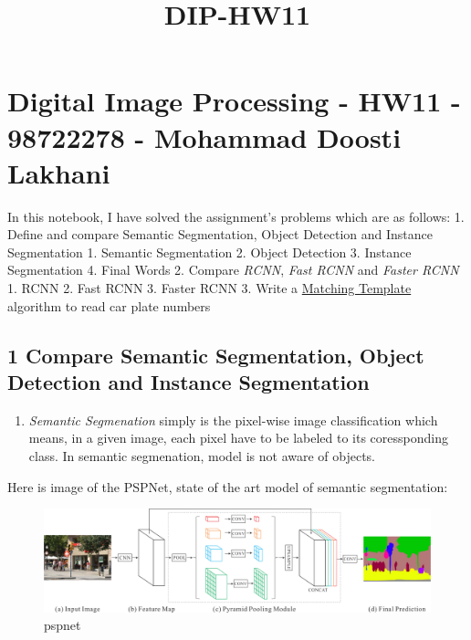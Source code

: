 \documentclass[11pt]{article}
\title{DIP-HW11}
\makeatletter
\def\maxwidth{\ifdim\Gin@nat@width>\linewidth\linewidth
    \else\Gin@nat@width\fi}
\let\Oldincludegraphics\includegraphics
\renewcommand{\includegraphics}[1]{\Oldincludegraphics[width=.8\maxwidth]{#1}}
\providecommand{\tightlist}{%
      \setlength{\itemsep}{0pt}\setlength{\parskip}{0pt}}
\makeatother
\begin{document}
    
    
    \maketitle
    
    

    
    \hypertarget{digital-image-processing---hw11---98722278---mohammad-doosti-lakhani}{%
\section{Digital Image Processing - HW11 - 98722278 - Mohammad Doosti
Lakhani}\label{digital-image-processing---hw11---98722278---mohammad-doosti-lakhani}}

In this notebook, I have solved the assignment's problems which are as
follows: 1. Define and compare Semantic Segmentation, Object Detection
and Instance Segmentation 1. Semantic Segmentation 2. Object Detection
3. Instance Segmentation 4. Final Words 2. Compare \emph{RCNN},
\emph{Fast RCNN} and \emph{Faster RCNN} 1. RCNN 2. Fast RCNN 3. Faster
RCNN 3. Write a
\href{https://docs.opencv.org/2.4/modules/imgproc/doc/object_detection.html?highlight=matchtemplate}{Matching
Template} algorithm to read car plate numbers

    \hypertarget{compare-semantic-segmentation-object-detection-and-instance-segmentation}{%
\subsection{1 Compare Semantic Segmentation, Object Detection and
Instance
Segmentation}\label{compare-semantic-segmentation-object-detection-and-instance-segmentation}}

    \begin{enumerate}
\def\labelenumi{\arabic{enumi}.}
\tightlist
\item
  \emph{Semantic Segmenation} simply is the pixel-wise image
  classification which means, in a given image, each pixel have to be
  labeled to its coressponding class. In semantic segmenation, model is
  not aware of objects.
\end{enumerate}

Here is image of the PSPNet, state of the art model of semantic
segmentation:

\begin{figure}
\centering
\includegraphics{wiki/pspnet.png}
\caption{pspnet}
\end{figure}
\end{document}
